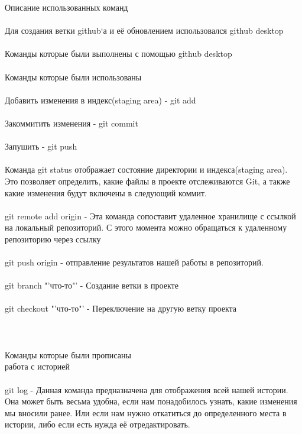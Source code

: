 \documentclass{article}
\begin{document}
\newpage
\huge {Описание использованных команд} 
\\ \\
\large{Для создания ветки github`а и её обновлением использовался github desktop}
\\ \\
\Large{Команды которые были выполнены с помощью github desktop}
\\ \\
\large{Команды которые были использованы}
\\ \\
\large{Добавить изменения в индекс(staging area) - git add}
\\ \\
\large{Закоммитить изменения - git commit}
\\ \\
\large{Запушить - git push}
\\ \\
\large{Команда git status отображает состояние директории и индекса(staging area). Это позволяет определить, какие файлы в проекте отслеживаются Git, а также какие изменения будут включены в следующий коммит.}
\\ \\
\large{git remote add origin - Эта команда сопоставит удаленное хранилище с ссылкой на локальный репозиторий. С этого момента можно обращаться к удаленному репозиторию через  ссылку}
\\ \\
\large{git push origin - отправление результатов нашей работы в репозиторий.}
\\ \\ \large{git branch "'что-то"' - Создание ветки в проекте}
\\ \\ \large{git checkout "'что-то"' - Переключение на другую ветку проекта}
\\ \\ \\ \\
\Large{Команды которые были прописаны \\ работа с историей}
\\ \\
\large{git log - Данная команда предназначена для отображения всей нашей истории. Она может быть весьма удобна, если нам понадобилось узнать, какие изменения мы вносили ранее. Или если нам нужно откатиться до определенного места в истории, либо если есть нужда её отредактировать.}
\\ \\
\end{document}
